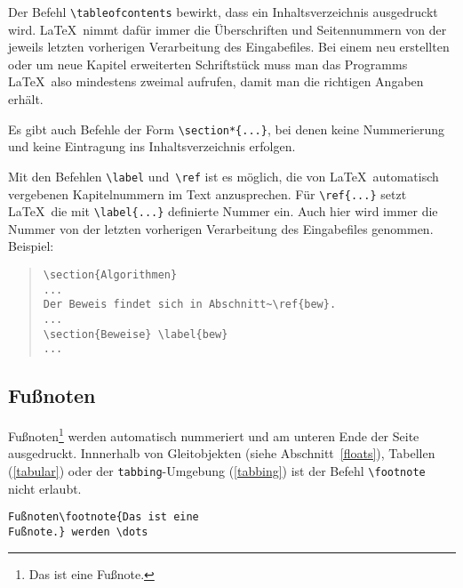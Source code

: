  
Der Befehl \lstinline|\tableofcontents| bewirkt, dass ein
Inhaltsverzeichnis ausgedruckt wird.
\LaTeX\ nimmt dafür immer die Überschriften und Seitennummern
von der jeweils letzten vorherigen Verarbeitung des Eingabefiles.
Bei einem neu erstellten oder um neue Kapitel erweiterten
Schriftstück muss man das Programms \LaTeX\ also mindestens
zweimal aufrufen, damit man die richtigen Angaben erhält.
 
Es gibt auch Befehle der Form \lstinline|\section*{...}|, bei denen
keine Nummerierung und keine Eintragung ins Inhaltsverzeichnis
erfolgen.

Mit den Befehlen \lstinline|\label| und~\lstinline|\ref| ist es möglich,
die von \LaTeX\ automatisch vergebenen Kapitelnummern im Text
anzusprechen.
Für \lstinline|\ref{...}| setzt \LaTeX\ die
mit \lstinline|\label{...}| definierte Nummer ein.
Auch hier wird immer die Nummer von der letzten vorherigen
Verarbeitung des Eingabefiles genommen.
Beispiel:
\begin{quote}
\begin{verbatim}
\section{Algorithmen}
...
Der Beweis findet sich in Abschnitt~\ref{bew}.
...
\section{Beweise} \label{bew}
...
\end{verbatim}
\end{quote}
 
 
\subsection{Fußnoten}
 
Fußnoten\footnote{Das 
ist eine Fußnote.} werden automatisch nummeriert
und am unteren Ende der Seite ausgedruckt.  
Innnerhalb von Gleitobjekten (siehe Abschnitt~\ref{floats}), 
Tabellen (\ref{tabular}) oder der \texttt{tabbing}-Umgebung (\ref{tabbing})
ist der Befehl \lstinline|\footnote| nicht erlaubt.
\exa
~
\exb
\begin{verbatim}
Fußnoten\footnote{Das ist eine
Fußnote.} werden \dots
\end{verbatim}
\exc
 
